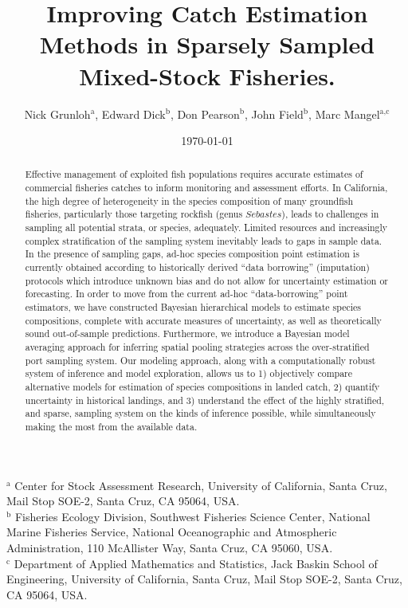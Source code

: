 \documentclass[12pt]{article}
\begin{document}
%
\title{Improving Catch Estimation Methods in Sparsely Sampled Mixed-Stock Fisheries.}
\author{Nick Grunloh$^\text{a}$, Edward Dick$^\text{b}$, Don Pearson$^\text{b}$, John Field$^\text{b}$, Marc Mangel$^\text{a,c}$}
\date{\today}
\maketitle
\noindent
$^\text{a}$ Center for Stock Assessment Research, University of California, Santa Cruz, Mail Stop SOE-2, Santa Cruz, CA 95064, USA.\\
$^\text{b}$ Fisheries Ecology Division, Southwest Fisheries Science Center, National Marine Fisheries Service, National Oceanographic and Atmospheric Administration, 110 McAllister Way, Santa Cruz, CA 95060, USA.\\
$^\text{c}$ Department of Applied Mathematics and Statistics, Jack Baskin School of Engineering, University of California, Santa Cruz, Mail Stop SOE-2, Santa Cruz, CA 95064, USA.

%
\begin{abstract}
Effective management of exploited fish populations requires accurate
estimates of commercial fisheries catches to inform monitoring and
assessment efforts. In California, the high degree of heterogeneity in
the species composition of many groundfish fisheries, particularly those
targeting rockfish (genus \(Sebastes\)), leads to challenges in sampling
all potential strata, or species, adequately. Limited resources and
increasingly complex stratification of the sampling system inevitably
leads to gaps in sample data. In the presence of sampling gaps, ad-hoc
species composition point estimation is currently obtained according to
historically derived ``data borrowing'' (imputation) protocols which 
introduce unknown bias and do not allow for uncertainty estimation or 
forecasting. In order to move from the current ad-hoc ``data-borrowing'' point 
estimators, we have constructed Bayesian hierarchical models to estimate 
species compositions, complete with accurate measures of uncertainty, as well 
as theoretically sound out-of-sample predictions. Furthermore, we 
introduce a Bayesian model averaging approach for inferring spatial 
pooling strategies across the over-stratified port sampling system. Our 
modeling approach, along with a computationally robust system of inference 
and model exploration, allows us to 1) objectively compare alternative models 
for estimation of species compositions in landed catch, 2) quantify uncertainty 
in historical landings, and 3) understand the effect of the highly stratified, 
and sparse, sampling system on the kinds of inference possible, 
while simultaneously making the most from the available data.
\end{abstract}
\end{document}
